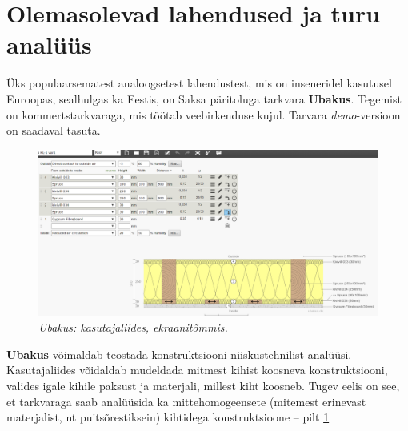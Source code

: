 \section{Olemasolevad lahendused ja turu analüüs}
Üks populaarsematest analoogsetest lahendustest, mis on inseneridel kasutusel Euroopas, sealhulgas ka Eestis, on Saksa päritoluga tarkvara \textbf{Ubakus}. 
Tegemist on kommertstarkvaraga, mis töötab veebirkenduse kujul. Tarvara \textit{demo}-versioon on saadaval tasuta.
\begin{figure}[ht]
    \centering
    \includegraphics[width=.8\textwidth]{figures/problem_statement/01_ubakus.png}
    \caption[Ubakus tarkvara katutajaliides, ekraanitõmmis]{\textit{Ubakus: kasutajaliides, ekraanitõmmis.}}
    \label{fig:ubakus_sample}
\end{figure}

\textbf{Ubakus} võimaldab teostada konstruktsiooni niiskustehnilist analüüsi. Kasutajaliides võidaldab 
mudeldada mitmest kihist koosneva konstruktsiooni, valides igale kihile paksust ja materjali, millest 
kiht koosneb. Tugev eelis on see, et tarkvaraga saab analüüsida ka mittehomogeensete (mitemest erinevast 
materjalist, nt puitsõrestiksein) kihtidega konstruktsioone -- pilt \ref{fig:ubakus_sample}

